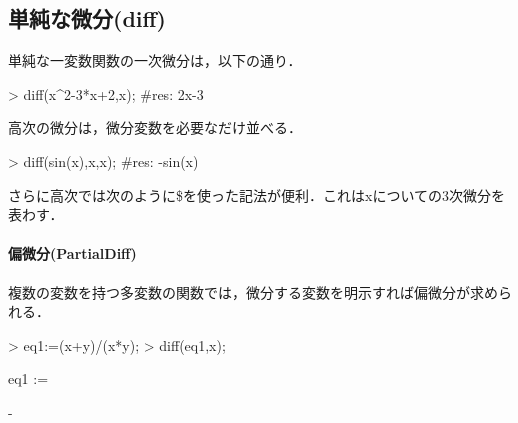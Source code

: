 \subsection{単純な微分(diff)}
単純な一変数関数の一次微分は，以下の通り．
\begin{MapleInput}
> diff(x^2-3*x+2,x);	#res: 2x-3
\end{MapleInput}
高次の微分は，微分変数を必要なだけ並べる．
\begin{MapleInput}
> diff(sin(x),x,x);	#res: -sin(x)
\end{MapleInput}
さらに高次では次のように\$を使った記法が便利．これはxについての3次微分を表わす．

\paragraph{偏微分(PartialDiff)}
複数の変数を持つ多変数の関数では，微分する変数を明示すれば偏微分が求められる．
\begin{MapleInput}
> eq1:=(x+y)/(x*y);
> diff(eq1,x);
\end{MapleInput}
\begin{MapleOutput}
eq1 := \,{}
\end{MapleOutput}
\begin{MapleOutput}
{}-{}
\end{MapleOutput}